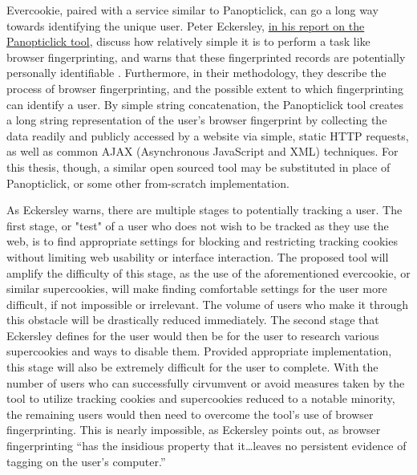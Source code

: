 \documentclass[11pt]{article}
\begin{document}
Evercookie, paired with a service similar to Panopticlick\cite{panopticlick}, can go a long way towards identifying the unique user. Peter Eckersley, \href{https://panopticlick.eff.org/static/browser-uniqueness.pdf}{in his report on the Panopticlick tool}, discuss how relatively simple it is to perform a task like browser fingerprinting, and warns that these fingerprinted records are potentially personally identifiable \cite{panopticlick-report}. Furthermore, in their methodology, they describe the process of browser fingerprinting, and the possible extent to which fingerprinting can identify a user. By simple string concatenation, the Panopticlick tool creates a long string representation of the user's browser fingerprint by collecting the data readily and publicly accessed by a website via simple, static HTTP requests, as well as common AJAX (Asynchronous JavaScript and XML) techniques. For this thesis, though, a similar open sourced tool may be substituted in place of Panopticlick, or some other from-scratch implementation.

As Eckersley warns, there are multiple stages to potentially tracking a user. The first stage, or "test" of a user who does not wish to be tracked as they use the web, is to find appropriate settings for blocking and restricting tracking cookies without limiting web usability or interface interaction. The proposed tool will amplify the difficulty of this stage, as the use of the aforementioned evercookie, or similar supercookies, will make finding comfortable settings for the user more difficult, if not impossible or irrelevant. The volume of users who make it through this obstacle will be drastically reduced immediately. The second stage that Eckersley defines for the user would then be for the user to research various supercookies and ways to disable them. Provided appropriate implementation, this stage will also be extremely difficult for the user to complete. With the number of users who can successfully cirvumvent or avoid measures taken by the tool to utilize tracking cookies and supercookies reduced to a notable minority, the remaining users would then need to overcome the tool's use of browser fingerprinting. This is nearly impossible, as Eckersley points out, as browser fingerprinting ``has the insidious property that it\dots leaves no persistent evidence of tagging on the user's computer.'' \cite{panopticlick-report}
\end{document}
